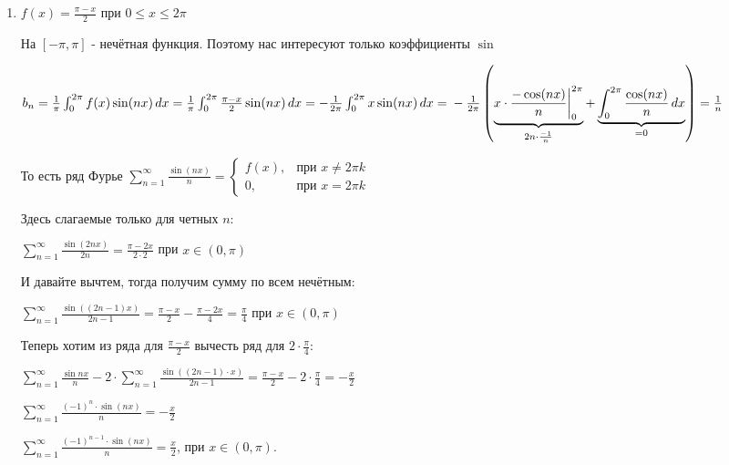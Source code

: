 \begin{example}
    \begin{enumerate}
        \item {
            $f(x) = \frac{\pi - x}{2}$ при $0 \leqslant x \leqslant 2\pi$


            На $[-\pi, \pi]$ - нечётная функция. Поэтому нас интересуют только коэффициенты $\sin$

            $b_n = \frac{1}{\pi} \int_0^{2\pi} f(x) \sin (nx) \, dx = \frac{1}{\pi} \int_0^{2\pi} \frac{\pi - x}{2} \sin (nx) \, dx = -\frac{1}{2\pi} \int_0^{2\pi} x \sin (nx) \, dx = \\
            - \frac{1}{2\pi} \left ( \underbrace{x \cdot \frac{-\cos (nx)}{n} \bigg |_{0}^{2\pi}}_{2n \cdot \frac{-1}{n}} + \underbrace{\int_0^{2\pi} \frac{\cos (nx)}{n} \, dx}_{= 0} \right ) = \frac{1}{n}$

            То есть ряд Фурье $\sum\limits_{n = 1}^\infty \frac{\sin (nx)}{n} =
            \begin{cases}
                f(x), & \text{при $x \neq 2\pi k$} \\
                0, & \text{при $x = 2\pi k$}
            \end{cases}$


            Здесь слагаемые только для четных $n$:

            $\sum\limits_{n =1}^\infty \frac{\sin (2 n x)}{2n} = \frac{\pi - 2x}{2 \cdot 2}$ при $x \in (0, \pi)$


            И давайте вычтем, тогда получим сумму по всем нечётным:

            $\sum\limits_{n = 1}^\infty \frac{\sin ((2n - 1)x)}{2n - 1} = \frac{\pi - x}{2} - \frac{\pi - 2x}{4} = \frac{\pi}{4}$ при $x \in (0, \pi)$

            Теперь хотим из ряда для $\frac{\pi-x}{2}$ вычесть ряд для $2 \cdot \frac{\pi}{4}$:

            $ \sum\limits_{n =1}^\infty \frac{\sin{nx}}{n} - 2\cdot \sum\limits_{n =1}^\infty \frac{\sin{((2n-1)\cdot x)}}{2n-1} = \frac{\pi-x}{2} - 2\cdot \frac{\pi}{4} = -\frac{x}{2} $

            $ \sum\limits_{n =1}^\infty \frac{(-1)^n \cdot \sin{(nx)}}{n} = -\frac{x}{2} $

            $ \sum\limits_{n =1}^\infty \frac{(-1)^{n-1} \cdot \sin{(nx)}}{n} = \frac{x}{2} $, при $x\in (0, \pi)$.

}
\end{enumerate}
\end{example}
